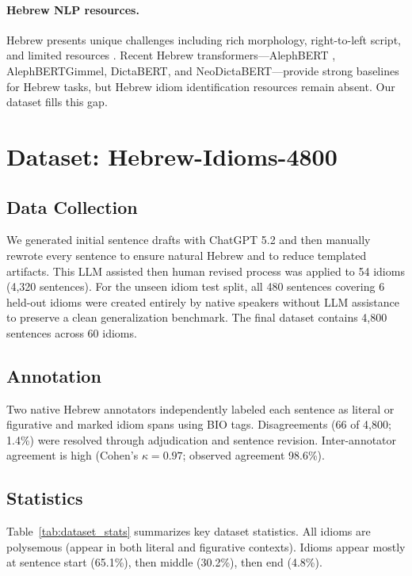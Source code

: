 \documentclass[11pt]{article}
\begin{document}
\paragraph{Hebrew NLP resources.}
Hebrew presents unique challenges including rich morphology, right-to-left script, and limited resources \citep{wintner2014hebrew,tsarfaty2019whats}. Recent Hebrew transformers---AlephBERT \citep{seker2022alephbert}, AlephBERTGimmel, DictaBERT, and NeoDictaBERT---provide strong baselines for Hebrew tasks, but Hebrew idiom identification resources remain absent. Our dataset fills this gap.

\section{Dataset: Hebrew-Idioms-4800}

\subsection{Data Collection}

We generated initial sentence drafts with ChatGPT 5.2 and then manually rewrote every sentence to ensure natural Hebrew and to reduce templated artifacts. This LLM assisted then human revised process was applied to 54 idioms (4,320 sentences). For the unseen idiom test split, all 480 sentences covering 6 held-out idioms were created entirely by native speakers without LLM assistance to preserve a clean generalization benchmark. The final dataset contains 4,800 sentences across 60 idioms.

\subsection{Annotation}

Two native Hebrew annotators independently labeled each sentence as literal or figurative and marked idiom spans using BIO tags. Disagreements (66 of 4,800; 1.4\%) were resolved through adjudication and sentence revision. Inter-annotator agreement is high (Cohen's $\kappa = 0.97$; observed agreement 98.6\%).

\subsection{Statistics}

Table~\ref{tab:dataset_stats} summarizes key dataset statistics. All idioms are polysemous (appear in both literal and figurative contexts). Idioms appear mostly at sentence start (65.1\%), then middle (30.2\%), then end (4.8\%).
\end{document}
